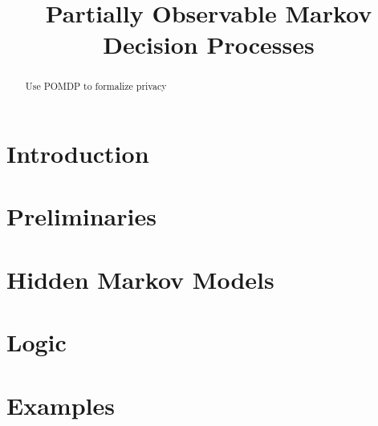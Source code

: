 \documentclass{llncs}
\title{Partially Observable Markov Decision Processes}
\begin{document}
\maketitle

\begin{abstract}
  Use POMDP to formalize privacy
\end{abstract}

\section{Introduction}
\label{section:introduction}

\section{Preliminaries}
\label{section:preliminaries}


\section{Hidden Markov Models}


\section{Logic}
\label{section:logic}


\section{Examples}
\label{section:examples}




\end{document}
